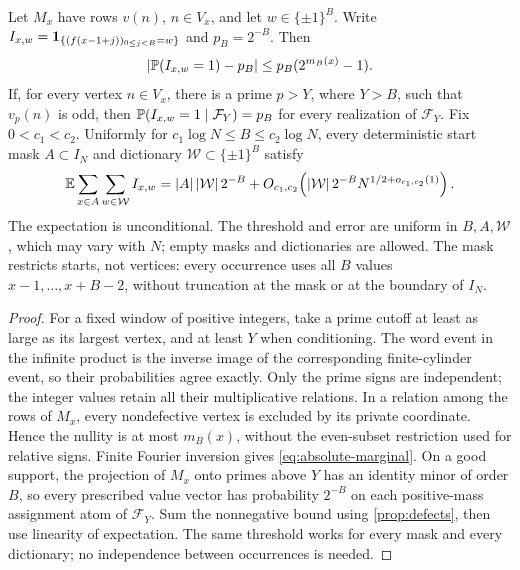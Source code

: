 \begin{corollary}\label{cor:absolute-marginal}
Let $M_x$ have rows $v(n)$, $n\in V_x$, and let $w\in\{\pm1\}^B$.
Write $I_{x,w}=\mathbf 1_{\{(f(x-1+j))_{0\le j<B}=w\}}$ and $p_B=2^{-B}$.
Then
\begin{equation}\label{eq:absolute-marginal}
 |\mathbb P(I_{x,w}=1)-p_B|\le p_B(2^{m_B(x)}-1).
\end{equation}
If, for every vertex $n\in V_x$, there is a prime $p>Y$, where $Y>B$,
such that $v_p(n)$ is odd, then
$\mathbb P(I_{x,w}=1\mid\mathcal F_Y)=p_B$ for every realization of
$\mathcal F_Y$.
Fix $0<c_1<c_2$. Uniformly for $c_1\log N\le B\le c_2\log N$,
every deterministic start mask $A\subset I_N$ and dictionary
$\mathcal W\subset\{\pm1\}^B$ satisfy
\[
 \mathbb E\sum_{x\in A}\sum_{w\in\mathcal W}I_{x,w}
 =|A|\,|\mathcal W|\,2^{-B}
 +O_{c_1,c_2}\!\left(|\mathcal W|\,2^{-B}N^{1/2+o_{c_1,c_2}(1)}\right).
\]
The expectation is unconditional. The threshold and error are uniform in
$B,A,\mathcal W$, which may vary with $N$; empty masks and dictionaries
are allowed. The mask restricts starts, not vertices: every occurrence
uses all $B$ values $x-1,\ldots,x+B-2$, without truncation at the mask or
at the boundary of $I_N$.
\end{corollary}
\begin{proof}
For a fixed window of positive integers, take a prime cutoff at least
as large as its largest vertex, and at least $Y$ when conditioning.
The word event in the infinite product
is the inverse image of the corresponding finite-cylinder event, so their
probabilities agree exactly. Only the prime signs are independent; the
integer values retain all their multiplicative relations.
In a relation among the rows of $M_x$, every nondefective vertex is
excluded by its private coordinate. Hence the nullity is at most $m_B(x)$,
without the even-subset restriction used for relative signs. Finite Fourier
inversion gives \eqref{eq:absolute-marginal}. On a good support, the
projection of $M_x$ onto primes above $Y$ has an identity minor of order
$B$, so every prescribed value vector has probability $2^{-B}$ on each
positive-mass assignment atom of $\mathcal F_Y$. Sum the nonnegative
bound using \cref{prop:defects}, then use linearity of expectation.
The same threshold works for every mask and every dictionary; no
independence between occurrences is needed.
\end{proof}

